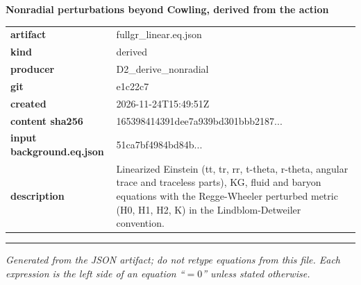 \documentclass[10pt,a4paper]{article}
\begin{document}
{\Large\bfseries Nonradial perturbations beyond Cowling, derived from the action}\par
\smallskip
\begin{tabular}{@{}lp{}@{}}\textbf{artifact} & fullgr\_linear.eq.json\\\textbf{kind} & derived\\\textbf{producer} & D2\_derive\_nonradial\\\textbf{git} & e1c22c7\\\textbf{created} & 2026-11-24T15:49:51Z\\\textbf{content sha256} & 165398414391dee7a939bd301bbb2187...\\\textbf{input background.eq.json} & 51ca7bf4984bd84b...\\\textbf{description} & Linearized Einstein (tt, tr, rr, t-theta, r-theta, angular trace and traceless parts), KG, fluid and baryon equations with the Regge-Wheeler perturbed metric (H0, H1, H2, K) in the Lindblom-Detweiler convention.\\\end{tabular}
\par\medskip\hrule\medskip

\textit{Generated from the JSON artifact; do not retype equations from this file. Each expression is the left side of an equation ``$= 0$'' unless stated otherwise.}\par
\end{document}
